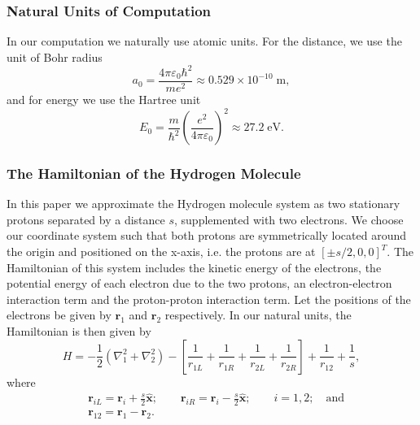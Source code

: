 \documentclass[twoside]{article}
\newcommand{\unit}[1]{\ensuremath{\; \mathrm{#1}}}
\newcommand{\bfr}{\ensuremath{\mathbf{r}}}
\begin{document}
\subsubsection*{Natural Units of Computation}
In our computation we naturally use atomic units. For the distance, we use the unit of Bohr radius
\begin{equation}
a_0 = \frac{4\pi \varepsilon_0 \hbar^2}{me^2} \approx 0.529 \times 10^{-10} \unit{m},
\end{equation}
and for energy we use the Hartree unit
\begin{equation}
E_0 = \frac{m}{\hbar^2} \left(\frac{e^2}{4\pi \varepsilon_0}\right)^2 \approx 27.2 \unit{eV}. 
\end{equation}

\subsubsection*{The Hamiltonian of the Hydrogen Molecule}
In this paper we approximate the Hydrogen molecule system as two stationary protons separated by a distance $s$, supplemented with two electrons. We choose our coordinate system such that both protons are symmetrically located around the origin and positioned on the x-axis, i.e. the protons are at $[\pm s/2,0,0]^T$. The Hamiltonian of this system includes the kinetic energy of the electrons, the potential energy of each electron due to the two protons, an electron-electron interaction term and the proton-proton interaction term. Let the positions of the electrons be given by $\bfr_1$ and $\bfr_2$ respectively. In our natural units, the Hamiltonian is then given by
\begin{equation}
H = -\frac{1}{2} (\nabla_1^2 + \nabla_2^2) - \left[ \frac{1}{r_{1L}} + \frac{1}{r_{1R}} + \frac{1}{r_{2L}} + \frac{1}{r_{2R}}  \right] + \frac{1}{r_{12}} + \frac{1}{s},
\end{equation}
where
\begin{equation}
\begin{split}
&\bfr_{iL} = \bfr_i + \frac{s}{2} \mathbf{\hat{x}}; \quad\quad \bfr_{iR} = \bfr_i - \frac{s}{2} \mathbf{\hat{x}}; \quad \quad i=1,2; \quad \mbox{and} \\
&\bfr_{12} = \bfr_1 - \bfr_2.
\end{split}
\end{equation}
\end{document}
